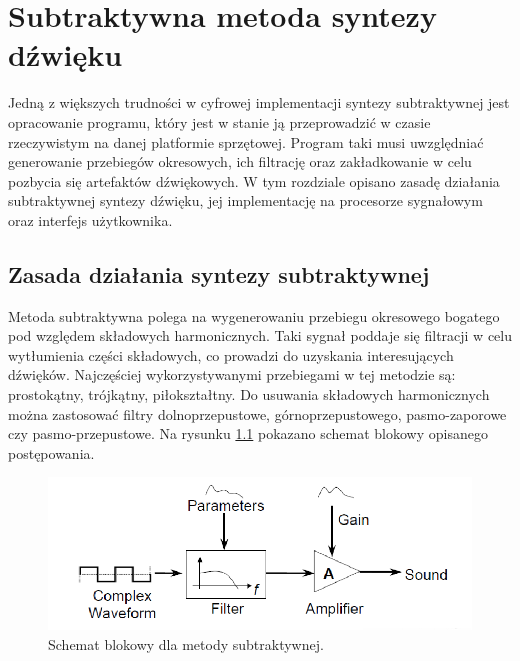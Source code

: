 \chapter{Subtraktywna metoda syntezy dźwięku}\label{chapter_subtractive}
Jedną z większych trudności w cyfrowej implementacji syntezy subtraktywnej jest opracowanie programu, który jest w stanie ją przeprowadzić w czasie rzeczywistym na danej platformie sprzętowej. Program taki musi uwzględniać generowanie przebiegów okresowych, ich filtrację oraz zakładkowanie w celu pozbycia się artefaktów dźwiękowych. W tym rozdziale opisano zasadę działania subtraktywnej syntezy dźwięku, jej implementację na procesorze sygnałowym oraz interfejs użytkownika.
\section{Zasada działania syntezy subtraktywnej}
Metoda subtraktywna polega na wygenerowaniu przebiegu okresowego bogatego pod względem składowych harmonicznych. Taki sygnał poddaje się filtracji w celu wytłumienia części składowych, co prowadzi do uzyskania interesujących dźwięków. Najczęściej wykorzystywanymi przebiegami w tej metodzie są: prostokątny, trójkątny, piłokształtny. Do usuwania składowych harmonicznych można zastosować filtry dolnoprzepustowe, górnoprzepustowego, pasmo-zaporowe czy pasmo-przepustowe. Na rysunku \ref{rys:sub_diagram} pokazano schemat blokowy opisanego postępowania.

\begin{figure}[H]
	\centering
	\includegraphics[width=12cm]{grafiki/sub_diagram}
	\captionsetup{justification=centering}
	\caption{Schemat blokowy dla metody subtraktywnej.}
	\label{rys:sub_diagram}
\end{figure}

